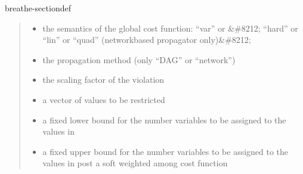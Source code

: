 \documentclass[letterpaper,10pt,openany,oneside,english]{sphinxmanual}
\begin{document}
\begin{fulllineitems}
\begin{sphinxuseclass}{breathe-sectiondef}
\begin{fulllineitems}
\begin{quote}
\begin{description}
\begin{itemize}
\item {} 
\sphinxAtStartPar
{} \textendash{} the semantics of the global cost function: “var” or \&\#8212; “hard” or “lin” or “quad” (network\sphinxhyphen{}based propagator only)\&\#8212; 

\item {} 
\sphinxAtStartPar
{} \textendash{} the propagation method (only “DAG” or “network”) 

\item {} 
\sphinxAtStartPar
{} \textendash{} the scaling factor of the violation 

\item {} 
\sphinxAtStartPar
{} \textendash{} a vector of values to be restricted 

\item {} 
\sphinxAtStartPar
{} \textendash{} a fixed lower bound for the number variables to be assigned to the values in  

\item {} 
\sphinxAtStartPar
{} \textendash{} a fixed upper bound for the number variables to be assigned to the values in  post a soft weighted among cost function 

\end{itemize}

\end{description}\end{quote}

\end{fulllineitems}



\end{sphinxuseclass}
\end{fulllineitems}
\end{document}

